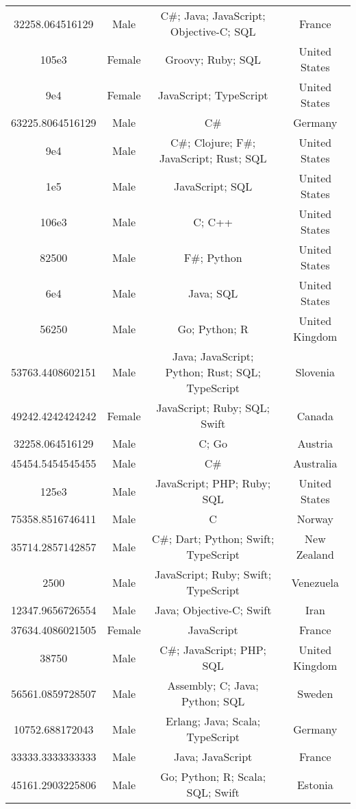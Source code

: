 \begin{center}
\begin{tabular}{ |c|c|c|c| }
32258.064516129  &  Male  &  C\#; Java; JavaScript; Objective-C; SQL  &  France  \\ 
105e3  &  Female  &  Groovy; Ruby; SQL  &  United States  \\ 
9e4  &  Female  &  JavaScript; TypeScript  &  United States  \\ 
63225.8064516129  &  Male  &  C\#  &  Germany  \\ 
9e4  &  Male  &  C\#; Clojure; F\#; JavaScript; Rust; SQL  &  United States  \\ 
1e5  &  Male  &  JavaScript; SQL  &  United States  \\ 
106e3  &  Male  &  C; C++  &  United States  \\ 
82500  &  Male  &  F\#; Python  &  United States  \\ 
6e4  &  Male  &  Java; SQL  &  United States  \\ 
56250  &  Male  &  Go; Python; R  &  United Kingdom  \\ 
53763.4408602151  &  Male  &  Java; JavaScript; Python; Rust; SQL; TypeScript  &  Slovenia  \\ 
49242.4242424242  &  Female  &  JavaScript; Ruby; SQL; Swift  &  Canada  \\ 
32258.064516129  &  Male  &  C; Go  &  Austria  \\ 
45454.5454545455  &  Male  &  C\#  &  Australia  \\ 
125e3  &  Male  &  JavaScript; PHP; Ruby; SQL  &  United States  \\ 
75358.8516746411  &  Male  &  C  &  Norway  \\ 
35714.2857142857  &  Male  &  C\#; Dart; Python; Swift; TypeScript  &  New Zealand  \\ 
2500  &  Male  &  JavaScript; Ruby; Swift; TypeScript  &  Venezuela  \\ 
12347.9656726554  &  Male  &  Java; Objective-C; Swift  &  Iran  \\ 
37634.4086021505  &  Female  &  JavaScript  &  France  \\ 
38750  &  Male  &  C\#; JavaScript; PHP; SQL  &  United Kingdom  \\ 
56561.0859728507  &  Male  &  Assembly; C; Java; Python; SQL  &  Sweden  \\ 
10752.688172043  &  Male  &  Erlang; Java; Scala; TypeScript  &  Germany  \\ 
33333.3333333333  &  Male  &  Java; JavaScript  &  France  \\ 
45161.2903225806  &  Male  &  Go; Python; R; Scala; SQL; Swift  &  Estonia  \\ 

\end{tabular}
\end{center}
